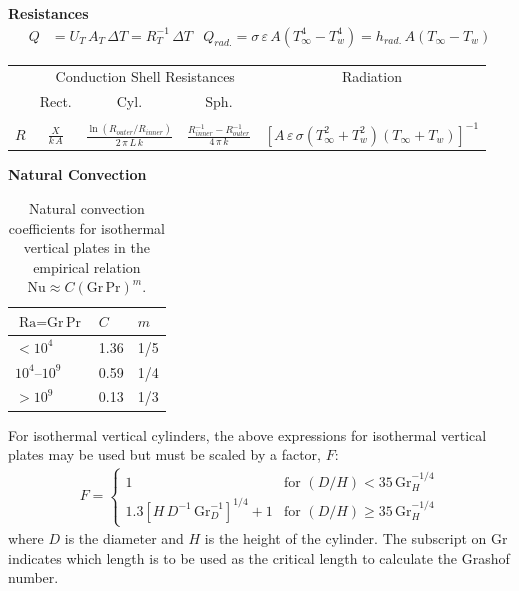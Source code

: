 \begin{datasheet}
{\bf Resistances}
\begin{align*}
  Q &= U_T\,A_T\,\Delta T = R_T^{-1}\,\Delta T & Q_{rad.}= \sigma\,\varepsilon\,A\left(T_\infty^4-T_w^4\right) = h_{rad.}\,A\left(T_\infty-T_w\right)
\end{align*}
\begin{center}
  \begin{tabular}{|r|c|c|c|c|}\hline
    & \multicolumn{3}{c|}{Conduction Shell Resistances} & Radiation\\
    & Rect. & Cyl. & Sph. & \\\hline
    & & & & \\
    $R$ & $\displaystyle\frac{X}{k\,A}$ & $\displaystyle\frac{\ln\left(R_{outer}/R_{inner}\right)}{2\,\pi\,L\,k}$ & $\displaystyle\frac{R_{inner}^{-1} - R_{outer}^{-1}}{4\,\pi\,k}$ & $\left[A\,\varepsilon\,\sigma\left(T_\infty^2+T_w^2\right)\left(T_\infty + T_w\right)\right]^{-1}$
    \\[5pt]\hline
  \end{tabular}
\end{center}

{\bf Natural Convection}
\begin{table}[h!]
  \begin{center}
    \begin{tabular}{|p{3cm}|p{3cm}|p{3cm}|}\hline
      $\text{Ra}=\text{Gr}\,\text{Pr}$ & $C$ & $m$\\\hline
      $< 10^{4}$ & 1.36 & 1/5\\
      $10^{4}$--$10^{9}$ & 0.59 & 1/4 \\
      $>10^{9}$ & 0.13 & 1/3\\\hline
    \end{tabular}
    \caption{\label{tab:conv}Natural convection coefficients for isothermal vertical
      plates in the empirical relation $\text{Nu}\approx C\left(\text{Gr}\,\text{Pr}\right)^m$.
    }
  \end{center}
\end{table}

For isothermal vertical cylinders, the above expressions for
isothermal vertical plates may be used but must be scaled by a factor,
$F$:
\begin{align*}
  F = \begin{cases}
    1 & \text{for }\left(D/H\right) < 35\,\text{Gr}^{-1/4}_H
    \\
    1.3\left[H\,D^{-1}\,\text{Gr}_D^{-1}\right]^{1/4}+1 & \text{for }\left(D/H\right) \ge 35\,\text{Gr}^{-1/4}_H
  \end{cases}
\end{align*}
where $D$ is the diameter and $H$ is the height of the cylinder. The
subscript on $\text{Gr}$ indicates which length is to be used as the
critical length to calculate the Grashof number.


\end{datasheet}
